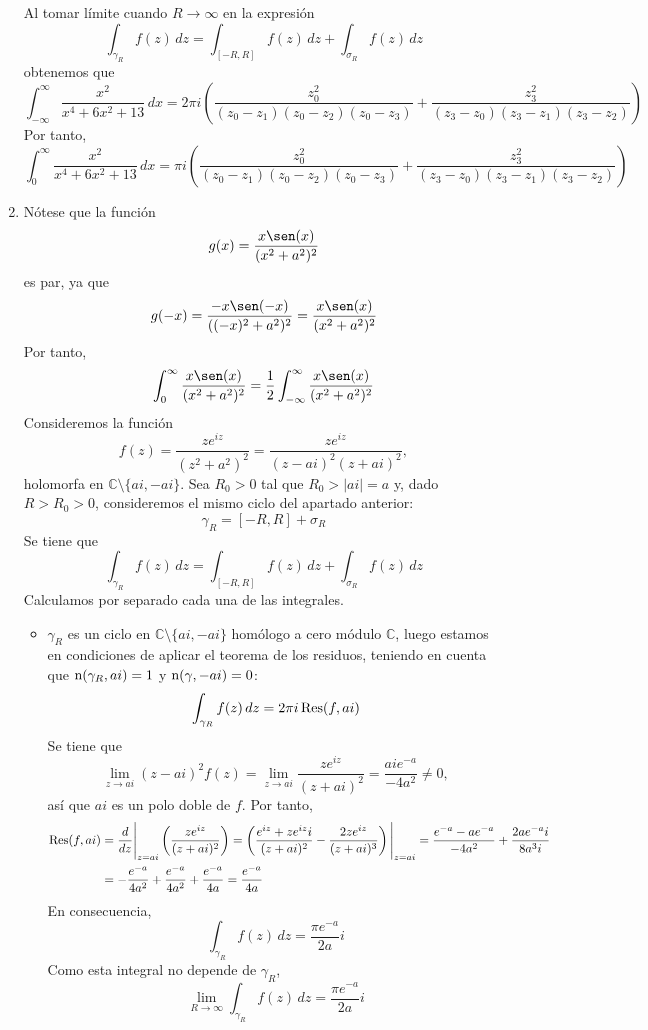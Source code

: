 \documentclass[11pt]{report}
\makeatletter
\renewenvironment{proof}[1][\proofname]{\par
  \pushQED{\qed}%
  \normalfont \topsep\z@skip %
  \trivlist
  \item[\hskip\labelsep
        \itshape
    #1\@addpunct{.}]\ignorespaces
}{%
  \popQED\endtrivlist\@endpefalse
}
\newcommand{\C}{\mathbb C}
\makeatother
\begin{document}
\begin{proof}
\begin{enumerate}
\begin{itemize}
  \end{itemize}
  Al tomar límite cuando $R \to \infty$ en la expresión
  \[\int_{\gamma_R}f(z)\, dz = \int_{[-R,R]}f(z)\, dz+\int_{\sigma_R}f(z)\, dz\]
  obtenemos que
  \[\int_{-\infty}^\infty \frac{x^2}{x^4+6x^2+13} \, dx = 2\pi i\left(\frac{z_0^2}{(z_0-z_1)(z_0-z_2)(z_0-z_3)}+\frac{z_3^2}{(z_3-z_0)(z_3-z_1)(z_3-z_2)}\right)\]
  Por tanto,
  \[\int_0^\infty \frac{x^2}{x^4+6x^2+13} \, dx = \pi i\left(\frac{z_0^2}{(z_0-z_1)(z_0-z_2)(z_0-z_3)}+\frac{z_3^2}{(z_3-z_0)(z_3-z_1)(z_3-z_2)}\right)\]
  \item Nótese que la función 
  \[g(x)=\frac{x\sen(x)}{(x^2+a^2)^2}\]
  es par, ya que
  \[g(-x)=\frac{-x\sen(-x)}{((-x)^2+a^2)^2} = \frac{x\sen(x)}{(x^2+a^2)^2}\]
  Por tanto,
  \[\int_0^\infty \frac{x\sen(x)}{(x^2+a^2)^2} = \frac{1}{2}\int_{-\infty}^\infty\frac{x\sen(x)}{(x^2+a^2)^2} \]
  Consideremos la función
  \[f(z)=\frac{ze^{iz}}{(z^2+a^2)^2} = \frac{ze^{iz}}{(z-ai)^2(z+ai)^2},\]
  holomorfa en $\C \setminus \{ai, -ai\}$. Sea $R_0>0$ tal que $R_0 > |ai| = a$ y, dado $R>R_0>0$, consideremos el mismo ciclo del apartado anterior:
  \[\gamma_R = [-R,R]+\sigma_R\]
  Se tiene que
  \[\int_{\gamma_R}f(z)\, dz = \int_{[-R,R]} f(z)\, dz + \int_{\sigma_R}f(z) \, dz\]
  Calculamos por separado cada una de las integrales.
  \begin{itemize}
    \item $\gamma_R$ es un ciclo en $\C \setminus \{ai,-ai\}$ homólogo a cero módulo $\C$, luego estamos en condiciones de aplicar el teorema de los residuos, teniendo en cuenta que $\textup{n}(\gamma_R,ai) = 1$ y $\textup{n}(\gamma,-ai) = 0$:
    \[\int_{\gamma_R} f(z) \, dz = 2\pi i \, \textup{Res}(f,ai)\]
    Se tiene que
    \[\lim_{z \to ai} (z-ai)^2f(z)=\lim_{z \to ai} \frac{ze^{iz}}{(z+ai)^2} = \frac{aie^{-a}}{-4a^2}  \neq 0,\]
    así que $ai$ es un polo doble de $f$. Por tanto,
    \[\begin{aligned}[t]
      \textup{Res}(f,ai) &= \frac{d}{dz} \Bigg|_{z = ai} \left(\frac{ze^{iz}}{(z+ai)^2}\right) = \left(\frac{e^{iz}+ze^{iz}i}{(z+ai)^2}-\frac{2ze^{iz}}{(z+ai)^3}\right)\Bigg|_{z = ai} =\frac{e^{-a}-ae^{-a}}{-4a^2}+\frac{2ae^{-a}i}{8a^3i} \\
      &= -\frac{e^{-a}}{4a^2}+\frac{e^{-a}}{4a^2}+\frac{e^{-a}}{4a} = \frac{e^{-a}}{4a}
    \end{aligned}\]
    En consecuencia,
    \[\int_{\gamma_R} f(z) \, dz = \frac{\pi e^{-a}}{2a}i\]
    Como esta integral no depende de $\gamma_R$,
    \[\lim_{R \to \infty} \int_{\gamma_R} f(z) \, dz = \frac{\pi e^{-a}}{2a}i\]

\end{itemize}
\end{enumerate}
\end{proof}
\end{document}

